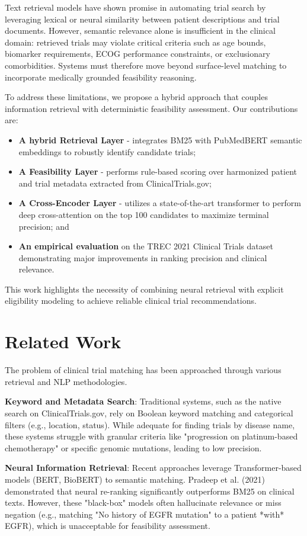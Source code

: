 \documentclass[11pt]{article}
\begin{document}
Text retrieval models have shown promise in automating trial search by leveraging lexical or neural similarity between patient descriptions and trial documents. However, semantic relevance alone is insufficient in the clinical domain: retrieved trials may violate critical criteria such as age bounds, biomarker requirements, ECOG performance constraints, or exclusionary comorbidities. Systems must therefore move beyond surface-level matching to incorporate medically grounded feasibility reasoning.

To address these limitations, we propose a hybrid approach that couples information retrieval with deterministic feasibility assessment. Our contributions are:
\begin{itemize}
    \item \textbf{A hybrid Retrieval Layer} - integrates BM25 with PubMedBERT semantic embeddings to robustly identify candidate trials;
    \item \textbf{A Feasibility Layer} - performs rule-based scoring over harmonized patient and trial metadata extracted from ClinicalTrials.gov;
    \item \textbf{A Cross-Encoder Layer} - utilizes a state-of-the-art transformer to perform deep cross-attention on the top 100 candidates to maximize terminal precision; and
    \item \textbf{An empirical evaluation} on the TREC 2021 Clinical Trials dataset demonstrating major improvements in ranking precision and clinical relevance.
\end{itemize}

This work highlights the necessity of combining neural retrieval with explicit eligibility modeling to achieve reliable clinical trial recommendations.

\section{Related Work}
The problem of clinical trial matching has been approached through various retrieval and NLP methodologies.

\textbf{Keyword and Metadata Search}: Traditional systems, such as the native search on ClinicalTrials.gov, rely on Boolean keyword matching and categorical filters (e.g., location, status). While adequate for finding trials by disease name, these systems struggle with granular criteria like "progression on platinum-based chemotherapy" or specific genomic mutations, leading to low precision.

\textbf{Neural Information Retrieval}: Recent approaches leverage Transformer-based models (BERT, BioBERT) to semantic matching. Pradeep et al. (2021) demonstrated that neural re-ranking significantly outperforms BM25 on clinical texts. However, these "black-box" models often hallucinate relevance or miss negation (e.g., matching "No history of EGFR mutation" to a patient *with* EGFR), which is unacceptable for feasibility assessment.
\end{document}

